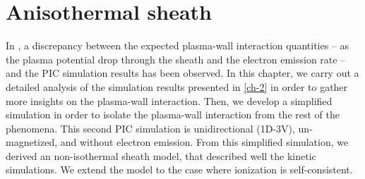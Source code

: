 



\chapter{Anisothermal sheath}
\label{ch-3}


\begin{Chabstract}
  
  In , a discrepancy between the expected plasma-wall interaction quantities -- as the plasma potential drop through the sheath and the electron emission rate -- and the \ac{PIC} simulation results has been observed.
  In this chapter, we carry out a detailed analysis of the simulation results presented in \cref{ch-2}  in order to gather more insights on the plasma-wall interaction.
  Then, we develop a simplified simulation in order to isolate the plasma-wall interaction from the rest of the phenomena.
  This second \ac{PIC} simulation is unidirectional (\acs{1D}-\acs{3V}), un-magnetized, and without electron emission.
  From this simplified simulation, we derived an non-isothermal sheath model, that described well the kinetic simulations.
  We extend the model to the case where ionization is self-consistent.

\end{Chabstract}

% 
% 
% 
% 
% 


\minitoc













